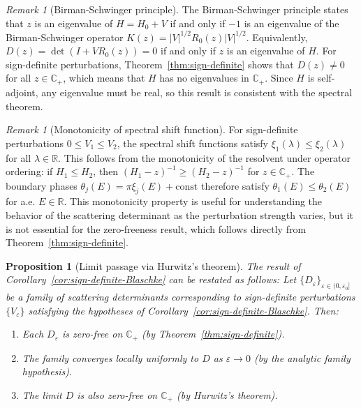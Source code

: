 ﻿\documentclass[12pt,a4paper]{article}
\newtheorem{proposition}[theorem]{Proposition}
\theoremstyle{definition}
\theoremstyle{remark}
\newtheorem{remark}[theorem]{Remark}
\newcommand{\CC}{\mathbb{C}}
\newcommand{\RR}{\mathbb{R}}
\begin{document}
\begin{remark}[Birman-Schwinger principle]
\label{rem:birman-schwinger-principle}
The Birman-Schwinger principle states that $z$ is an eigenvalue of $H = H_0 + V$ if and only if $-1$ is an eigenvalue of the Birman-Schwinger operator $K(z) = |V|^{1/2} R_0(z) |V|^{1/2}$. Equivalently, $D(z) = \det(I + VR_0(z)) = 0$ if and only if $z$ is an eigenvalue of $H$. For sign-definite perturbations, Theorem~\ref{thm:sign-definite} shows that $D(z) \neq 0$ for all $z \in \CC_+$, which means that $H$ has no eigenvalues in $\CC_+$. Since $H$ is self-adjoint, any eigenvalue must be real, so this result is consistent with the spectral theorem.
\end{remark}

\begin{remark}[Monotonicity of spectral shift function]
\label{rem:spectral-shift-monotonicity}
For sign-definite perturbations $0 \leq V_1 \leq V_2$, the spectral shift functions satisfy $\xi_1(\lambda) \leq \xi_2(\lambda)$ for all $\lambda \in \RR$. This follows from the monotonicity of the resolvent under operator ordering: if $H_1 \leq H_2$, then $(H_1 - z)^{-1} \geq (H_2 - z)^{-1}$ for $z \in \CC_+$. The boundary phases $\theta_j(E) = \pi \xi_j(E) + \text{const}$ therefore satisfy $\theta_1(E) \leq \theta_2(E)$ for a.e. $E \in \RR$. This monotonicity property is useful for understanding the behavior of the scattering determinant as the perturbation strength varies, but it is not essential for the zero-freeness result, which follows directly from Theorem~\ref{thm:sign-definite}.
\end{remark}

\begin{proposition}[Limit passage via Hurwitz's theorem]
\label{prop:limit-hurwitz}
The result of Corollary~\ref{cor:sign-definite-Blaschke} can be restated as follows: Let $\{D_\varepsilon\}_{\varepsilon \in (0,\varepsilon_0]}$ be a family of scattering determinants corresponding to sign-definite perturbations $\{V_\varepsilon\}$ satisfying the hypotheses of Corollary~\ref{cor:sign-definite-Blaschke}. Then:
\begin{enumerate}
\item Each $D_\varepsilon$ is zero-free on $\CC_+$ (by Theorem~\ref{thm:sign-definite}).
\item The family converges locally uniformly to $D$ as $\varepsilon \to 0$ (by the analytic family hypothesis).
\item The limit $D$ is also zero-free on $\CC_+$ (by Hurwitz's theorem).
\end{enumerate}
\end{proposition}
\end{document}
